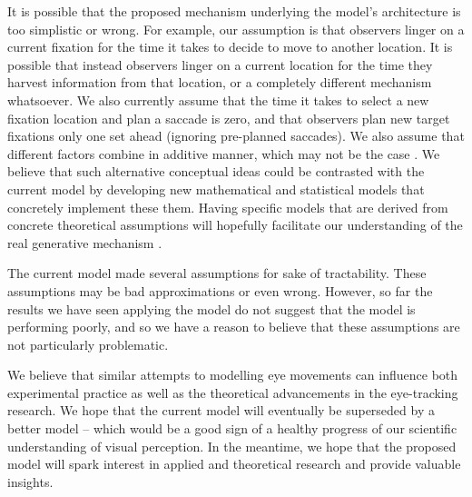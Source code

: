 \documentclass{article}
\begin{document}
It is possible that the proposed mechanism underlying the model's architecture is too simplistic or wrong. For example, our assumption is that observers linger on a current fixation for the time it takes to decide to move to another location. It is possible that instead observers linger on a current location for the time they harvest information from that location, or a completely different mechanism whatsoever. We also currently assume that the time it takes to select a new fixation location and plan a saccade is zero, and that observers plan new target fixations only one set ahead (ignoring pre-planned saccades). We also assume that different factors combine in additive manner, which may not be the case \citep{barthelme2013spatial}. We believe that such alternative conceptual ideas could be contrasted with the current model by developing new mathematical and statistical models that concretely implement these them. Having specific models that are derived from concrete theoretical assumptions will hopefully facilitate our understanding of the real generative mechanism \citep{borsboom2020theory,schutt2017likelihood}. 

The current model made several assumptions for sake of tractability. These assumptions may be bad approximations or even wrong. However, so far the results we have seen applying the model do not suggest that the model is performing poorly, and so we have a reason to believe that these assumptions are not particularly problematic.

We believe that similar attempts to modelling eye movements can influence both experimental practice as well as the theoretical advancements in the eye-tracking research. We hope that the current model will eventually be superseded by a better model -- which would be a good sign of a healthy progress of our scientific understanding of visual perception. In the meantime, we hope that the proposed model will spark interest in applied and theoretical research and provide valuable insights.


\end{document}
